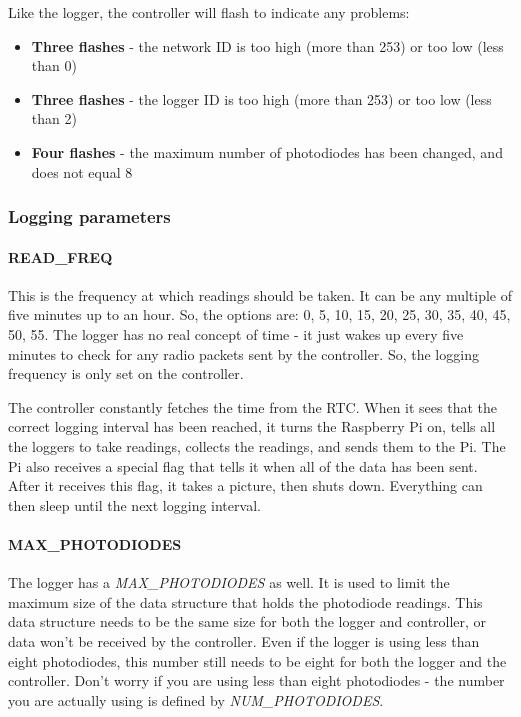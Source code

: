 \documentclass[10pt]{article}
\begin{document}
Like the logger, the controller will flash to indicate any problems:

\begin{itemize}
 \item \textbf{Three flashes}	- the network ID is too high (more than 253) or too low (less than 0)
 \item \textbf{Three flashes}	- the logger ID is too high (more than 253) or too low (less than 2)
 \item \textbf{Four flashes}	- the maximum number of photodiodes has been changed, and does not equal 8
\end{itemize}

\subsubsection{Logging parameters}

\paragraph{READ\_FREQ}
This is the frequency at which readings should be taken. It can be any multiple of five minutes up to an hour. So, the options are: 0, 5, 10, 15, 20, 25, 30, 35, 40, 45, 50, 55. The logger has no real concept of time - it just wakes up every five minutes to check for any radio packets sent by the controller. So, the logging frequency is only set on the controller.

The controller constantly fetches the time from the RTC. When it sees that the correct logging interval has been reached, it turns the Raspberry Pi on, tells all the loggers to take readings, collects the readings, and sends them to the Pi. The Pi also receives a special flag that tells it when all of the data has been sent. After it receives this flag, it takes a picture, then shuts down. Everything can then sleep until the next logging interval.

\paragraph{MAX\_PHOTODIODES}
The logger has a \textit{MAX\_PHOTODIODES} as well. It is used to limit the maximum size of the data structure that holds the photodiode readings. This data structure needs to be the same size for both the logger and controller, or data won't be received by the controller. Even if the logger is using less than eight photodiodes, this number still needs to be eight for both the logger and the controller. Don't worry if you are using less than eight photodiodes - the number you are actually using is defined by \textit{NUM\_PHOTODIODES}.
\end{document}
